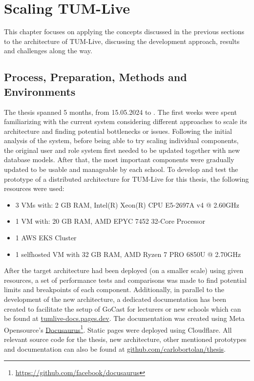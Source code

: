 
\chapter{Scaling TUM-Live}\label{chapter:scaling_tumlive}

This chapter focuses on applying the concepts discussed in the previous sections to the architecture of TUM-Live, discussing the development approach, results and challenges along the way. 

\section{Process, Preparation, Methods and Environments}

The thesis spanned 5 months, from 15.05.2024 to \getSubmissionDate{}. The first weeks were spent familiarizing with the current system considering different approaches to scale its architecture and finding potential bottlenecks or issues. Following the initial analysis of the system, before being able to try scaling individual components, the original user and role system first needed to be updated together with new database models. After that, the most important components were gradually updated to be usable and manageable by each school. 
To develop and test the prototype of a distributed architecture for TUM-Live for this thesis, the following resources were used:
\begin{itemize}
    \item 3 \ac{VM}s with: 2 GB RAM, Intel(R) Xeon(R) CPU E5-2697A v4 @ 2.60GHz
    \item 1 \ac{VM} with: 20 GB RAM, AMD EPYC 7452 32-Core Processor
    \item 1 \ac{AWS} \ac{EKS} Cluster
    \item 1 selfhosted \ac{VM} with 32 GB RAM, AMD Ryzen 7 PRO 6850U @ 2.70GHz
\end{itemize}

After the target architecture had been deployed (on a smaller scale) using given resources, a set of performance tests and comparisons was made to find potential limits and breakpoints of each component. 
Additionally, in parallel to the development of the new architecture, a dedicated documentation has been created to facilitate the setup of GoCast for lecturers or new schools which can be found at \href{https://tumlive-docs.pages.dev/}{tumlive-docs.pages.dev}. The documentation was created using Meta Opensource's \href{https://github.com/facebook/docusaurus}{Docusaurus}\footnote{\url{https://github.com/facebook/docusaurus}}. Static pages were deployed using Cloudflare.
All relevant source code for the thesis, new architecture, other mentioned prototypes and documentation can also be found at \href{https://github.com/carlobortolan/thesis}{github.com/carlobortolan/thesis}.

